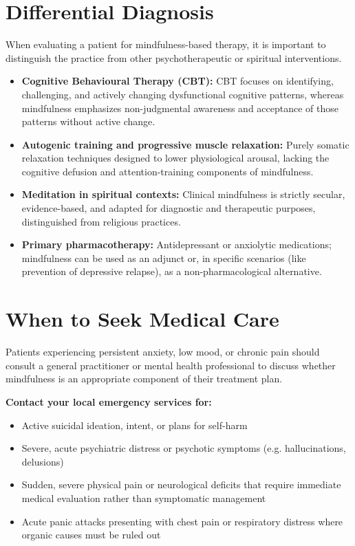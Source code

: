 \section*{Differential Diagnosis}
When evaluating a patient for mindfulness-based therapy, it is important to distinguish the practice from other psychotherapeutic or spiritual interventions.
\begin{itemize}
    \item \textbf{Cognitive Behavioural Therapy (CBT):} CBT focuses on identifying, challenging, and actively changing dysfunctional cognitive patterns, whereas mindfulness emphasizes non-judgmental awareness and acceptance of those patterns without active change.
    \item \textbf{Autogenic training and progressive muscle relaxation:} Purely somatic relaxation techniques designed to lower physiological arousal, lacking the cognitive defusion and attention-training components of mindfulness.
    \item \textbf{Meditation in spiritual contexts:} Clinical mindfulness is strictly secular, evidence-based, and adapted for diagnostic and therapeutic purposes, distinguished from religious practices.
    \item \textbf{Primary pharmacotherapy:} Antidepressant or anxiolytic medications; mindfulness can be used as an adjunct or, in specific scenarios (like prevention of depressive relapse), as a non-pharmacological alternative.
\end{itemize}

\section*{When to Seek Medical Care}
Patients experiencing persistent anxiety, low mood, or chronic pain should consult a general practitioner or mental health professional to discuss whether mindfulness is an appropriate component of their treatment plan.

\textbf{Contact your local emergency services for:}
\begin{itemize}
    \item Active suicidal ideation, intent, or plans for self-harm
    \item Severe, acute psychiatric distress or psychotic symptoms (e.g. hallucinations, delusions)
    \item Sudden, severe physical pain or neurological deficits that require immediate medical evaluation rather than symptomatic management
    \item Acute panic attacks presenting with chest pain or respiratory distress where organic causes must be ruled out
\end{itemize}

